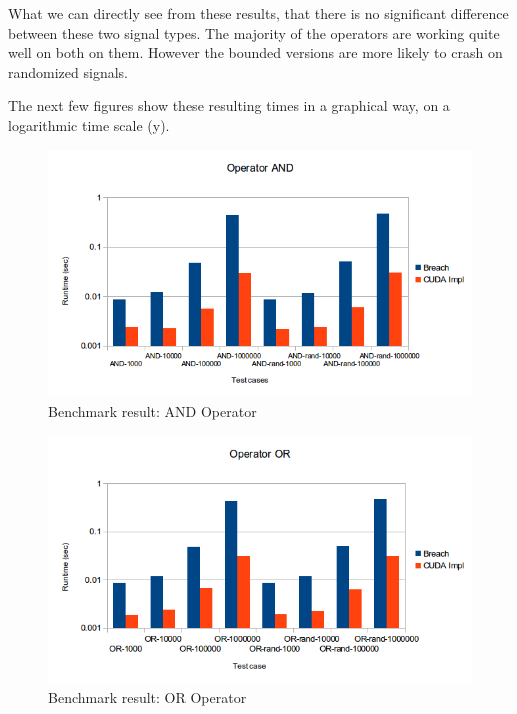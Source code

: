 \documentclass[a4paper,10pt]{article}
\begin{document}
What we can directly see from these results, that there is no significant difference between
these two signal types. The majority of the operators are working quite well on both on them. 
However the bounded versions are more likely to crash on randomized signals. 

The next few figures show these resulting times in a graphical way, on a logarithmic time scale (y).

\begin{figure}[H]
    \includegraphics[scale=0.5]{bm_and.png}
    \caption{
        \label{fig:bm_and}
        Benchmark result: AND Operator}
\end{figure}

\begin{figure}[H]
    \includegraphics[scale=0.5]{bm_or.png}
    \caption{
        \label{fig:bm_or}
        Benchmark result: OR Operator}
\end{figure}
\end{document}
